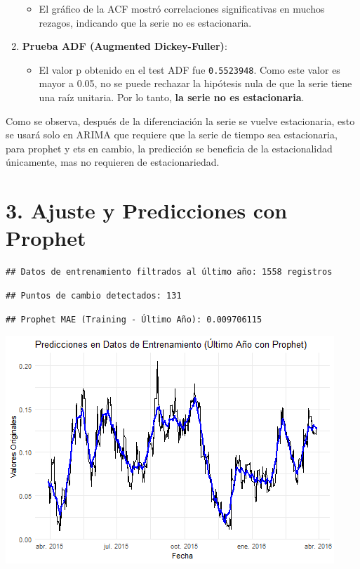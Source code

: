 \documentclass[
]{book}
\providecommand{\tightlist}{%
  \setlength{\itemsep}{0pt}\setlength{\parskip}{0pt}}
\begin{document}
\begin{enumerate}
  \begin{itemize}
  \tightlist
  \item
    El gráfico de la ACF mostró correlaciones significativas en muchos rezagos, indicando que la serie no es estacionaria.
  \end{itemize}
\item
  \textbf{Prueba ADF (Augmented Dickey-Fuller)}:

  \begin{itemize}
  \tightlist
  \item
    El valor p obtenido en el test ADF fue \texttt{0.5523948}. Como este valor es mayor a 0.05, no se puede rechazar la hipótesis nula de que la serie tiene una raíz unitaria. Por lo tanto, \textbf{la serie no es estacionaria}.
  \end{itemize}
\end{enumerate}

Como se observa, después de la diferenciación la serie se vuelve estacionaria, esto se usará solo en ARIMA que requiere que la serie de tiempo sea estacionaria, para prophet y ets en cambio, la predicción se beneficia de la estacionalidad únicamente, mas no requieren de estacionariedad.

\section{3. Ajuste y Predicciones con Prophet}\label{ajuste-y-predicciones-con-prophet}

\begin{verbatim}
## Datos de entrenamiento filtrados al último año: 1558 registros
\end{verbatim}

\begin{verbatim}
## Puntos de cambio detectados: 131
\end{verbatim}

\begin{verbatim}
## Prophet MAE (Training - Último Año): 0.009706115
\end{verbatim}

\includegraphics{bookdown_time_series_files/figure-latex/unnamed-chunk-13-1.png}
\end{document}
